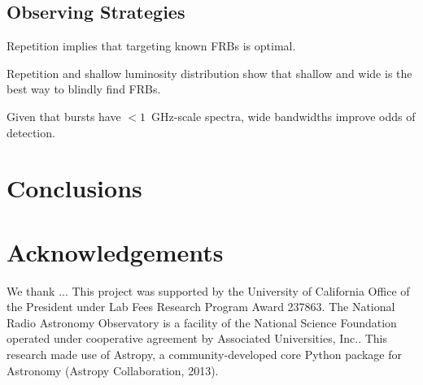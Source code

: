 \documentclass[twocolumn]{aastex61}
\begin{document}
\subsection{Observing Strategies}

Repetition implies that targeting known FRBs is optimal.

Repetition and shallow luminosity distribution show that shallow and wide is the best way to blindly find FRBs.

Given that bursts have $<1$~GHz-scale spectra, wide bandwidths improve odds of detection.

\section{Conclusions}




\section*{Acknowledgements}
We thank ...
This project was supported by the University of California Office of the President under Lab Fees Research Program Award 237863. The National Radio Astronomy Observatory is a facility of the National Science Foundation operated under cooperative agreement by Associated Universities, Inc.. This research made use of Astropy, a community-developed core Python package for Astronomy (Astropy Collaboration, 2013).




\end{document}
